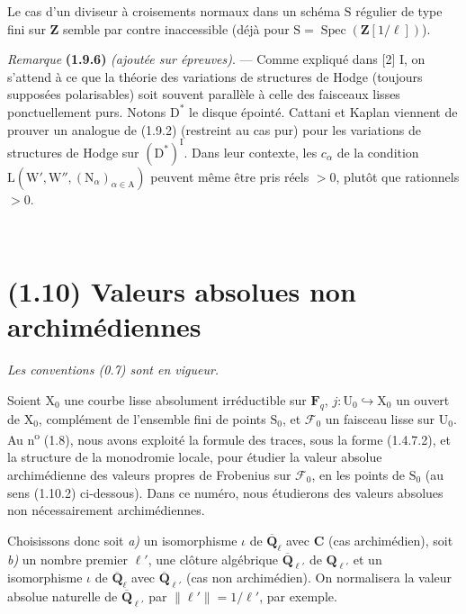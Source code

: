 \documentclass[11pt,leqno]{article}
\newcommand{\Page}[1]{\ifvmode\noindent\else\unskip\ \fi{\footnotesize\textcolor{gray}{[p.\,#1]}}\ \ignorespaces}
\begin{document}
Le cas d’un diviseur à croisements normaux dans un schéma \(\mathrm{S}\) régulier de type fini sur \(\mathbf{Z}\) semble par contre inaccessible (déjà pour \(\mathrm{S}=\operatorname{Spec}(\mathbf{Z}[1/\ell])\)).

\textit{Remarque} \textbf{(1.9.6)} \textit{(ajoutée sur épreuves)}. — Comme expliqué dans [2] I, on s’attend à ce que la théorie des variations de structures de Hodge (toujours supposées polarisables) soit souvent parallèle à celle des faisceaux lisses ponctuellement purs. Notons \(\mathrm{D}^*\) le disque épointé. Cattani et Kaplan viennent de prouver un analogue de (1.9.2) (restreint au cas pur) pour les variations de structures de Hodge sur \((\mathrm{D}^*)^{\mathrm{I}}\). Dans leur contexte, les \(c_\alpha\) de la condition \(\mathrm{L}(\mathrm{W}',\mathrm{W}'',(\mathrm{N}_\alpha)_{\alpha\in\mathrm{A}})\) peuvent même être pris réels \(>0\), plutôt que rationnels \(>0\).

\Page{182}
\section*{(1.10) Valeurs absolues non archimédiennes}

\textit{Les conventions \textup{(0.7)} sont en vigueur.}

Soient \(\mathrm{X}_0\) une courbe lisse absolument irréductible sur \(\mathbf{F}_q\), \(j:\mathrm{U}_0\hookrightarrow\mathrm{X}_0\) un ouvert de \(\mathrm{X}_0\), complément de l’ensemble fini de points \(\mathrm{S}_0\), et \(\mathscr{F}_0\) un faisceau lisse sur \(\mathrm{U}_0\). Au n\textsuperscript{o} (1.8), nous avons exploité la formule des traces, sous la forme (1.4.7.2), et la structure de la monodromie locale, pour étudier la valeur absolue archimédienne des valeurs propres de Frobenius sur \(\mathscr{F}_0\), en les points de \(\mathrm{S}_0\) (au sens (1.10.2) ci-dessous). Dans ce numéro, nous étudierons des valeurs absolues non nécessairement archimédiennes.

Choisissons donc soit \textit{a)} un isomorphisme \(\iota\) de \(\overline{\mathbf{Q}}_\ell\) avec \(\mathbf{C}\) (cas archimédien), soit \textit{b)} un nombre premier \(\ell'\), une clôture algébrique \(\overline{\mathbf{Q}}_{\ell'}\) de \(\mathbf{Q}_{\ell'}\) et un isomorphisme \(\iota\) de \(\overline{\mathbf{Q}}_\ell\) avec \(\overline{\mathbf{Q}}_{\ell'}\) (cas non archimédien). On normalisera la valeur absolue naturelle de \(\overline{\mathbf{Q}}_{\ell'}\) par \(\lVert\ell'\rVert=1/\ell'\), par exemple.
\end{document}
